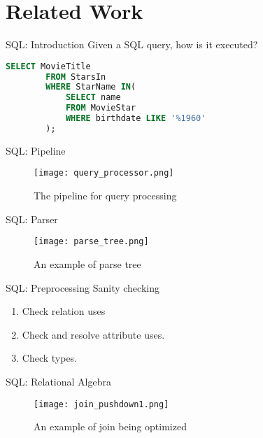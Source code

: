 \section{Related Work}
\frame{\sectionpage}


\begin{frame}[fragile]{SQL: Introduction}
    Given a SQL query, how is it executed?
    \begin{lstlisting}[language=SQL, caption= SQL query to execute.]
        SELECT MovieTitle
        FROM StarsIn
        WHERE StarName IN(
            SELECT name
            FROM MovieStar
            WHERE birthdate LIKE '%1960'
        );
    \end{lstlisting}
\end{frame}

\begin{frame}{SQL: Pipeline}
    \begin{figure}
        \centering
        \texttt{[image: query\_processor.png]}\\
        \caption{The pipeline for query processing}
        \label{fig:query_processor}
    \end{figure}
\end{frame}

\begin{frame}{SQL: Parser}
    \begin{figure}
        \centering
        \texttt{[image: parse\_tree.png]}\\
        \caption{An example of parse tree}
        \label{fig:prase_tree}
    \end{figure}
\end{frame}

\begin{frame}{SQL: Preprocessing}
    Sanity checking
    \begin{enumerate}
        \item Check relation uses
        \item Check and resolve attribute uses.
        \item Check types.
    \end{enumerate}
\end{frame}

\begin{frame}{SQL: Relational Algebra}
    \begin{figure}
        \centering
        \texttt{[image: join\_pushdown1.png]}\\
        \caption{An example of join being optimized}
        \label{fig:j_1}
    \end{figure}
\end{frame}

